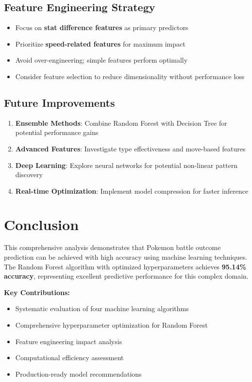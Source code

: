 \documentclass[12pt,a4paper]{article}
\begin{document}
\subsection{Feature Engineering Strategy}

\begin{itemize}
    \item Focus on \textbf{stat difference features} as primary predictors
    \item Prioritize \textbf{speed-related features} for maximum impact
    \item Avoid over-engineering; simple features perform optimally
    \item Consider feature selection to reduce dimensionality without performance loss
\end{itemize}

\subsection{Future Improvements}

\begin{enumerate}
    \item \textbf{Ensemble Methods}: Combine Random Forest with Decision Tree for potential performance gains
    \item \textbf{Advanced Features}: Investigate type effectiveness and move-based features
    \item \textbf{Deep Learning}: Explore neural networks for potential non-linear pattern discovery
    \item \textbf{Real-time Optimization}: Implement model compression for faster inference
\end{enumerate}

\section{Conclusion}

This comprehensive analysis demonstrates that Pokemon battle outcome prediction can be achieved with high accuracy using machine learning techniques. The Random Forest algorithm with optimized hyperparameters achieves \textbf{95.14\% accuracy}, representing excellent predictive performance for this complex domain.

\textbf{Key Contributions:}
\begin{itemize}
    \item Systematic evaluation of four machine learning algorithms
    \item Comprehensive hyperparameter optimization for Random Forest
    \item Feature engineering impact analysis
    \item Computational efficiency assessment
    \item Production-ready model recommendations
\end{itemize}
\end{document}

